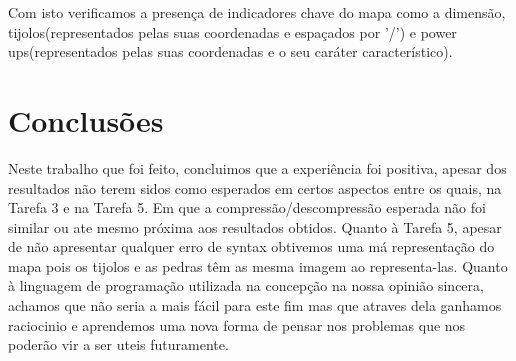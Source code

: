 \documentclass[a4paper]{article}
\begin{document}
Com isto verificamos a presença de indicadores chave do mapa como a dimensão, tijolos(representados pelas suas coordenadas e espaçados por '/') e power ups(representados pelas suas coordenadas e o seu caráter característico).

\section{Conclusões}
\label{sec:conclusao}

Neste trabalho que foi feito, concluimos que a experiência foi positiva, apesar dos resultados não terem sidos como esperados em certos aspectos entre os quais, na Tarefa 3 e na Tarefa 5. Em que a compressão/descompressão esperada não foi similar ou ate mesmo próxima aos resultados obtidos. Quanto à Tarefa 5, apesar de não apresentar qualquer erro de syntax obtivemos uma má representação do mapa pois os tijolos e as pedras têm as mesma imagem ao representa-las.
Quanto à linguagem de programação utilizada na concepção na nossa opinião sincera, achamos que não seria a mais fácil para este fim mas que atraves dela ganhamos raciocinio e aprendemos uma nova forma de pensar nos problemas que nos poderão vir a ser uteis futuramente.
\end{document}
